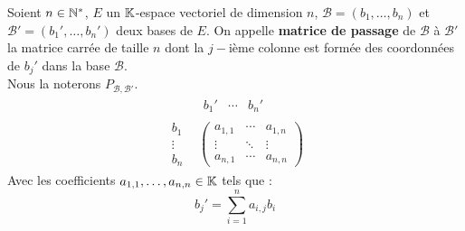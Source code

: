 \begin{definition}
    Soient $n \in \mathbb{N}^*$, $E$ un $\mathbb{K}$-espace vectoriel de dimension $n$, $\mathcal{B} = (b_1, \ldots, b_n)$ et $\mathcal{B}' = (b_1', \ldots, b_n')$ deux bases de $E$. On appelle \textbf{matrice de passage} de $\mathcal{B}$ à $\mathcal{B}'$ la matrice carrée de taille $n$ dont la $j-$ième colonne est formée des coordonnées de $b_j'$ dans la base $\mathcal{B}$. 
    \\
    Nous la noterons $P_{\mathcal{B}, \mathcal{B}'}$.
    \begin{align*}
    	&\begin{matrix}
    		b_1' & \cdots & b_n' 
    	\end{matrix}
    	\\
    	\begin{matrix}
    		b_1 \\
    		\vdots \\ 
    		b_n
    	\end{matrix}
    	&\begin{pmatrix}
    		a_{1,1} & \cdots & a_{1,n} \\
    		\vdots & \ddots & \vdots \\ 
    		a_{n,1} & \cdots & a_{n,n}
    	\end{pmatrix}
    \end{align*}
    Avec les coefficients $a_{1,1}, \ldots, a_{n,n} \in \mathbb{K}$ tels que :
    \[ b_j' = \sum_{i=1}^{n} a_{i,j} b_i  \]
\end{definition}

